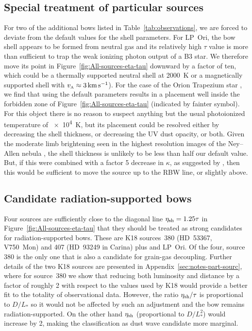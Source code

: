 \subsection{Special treatment of particular sources}
\label{sec:spec-treatm-part}

For two of the additional bows listed in Table~\ref{tab:observations},
we are forced to deviate from the default values for the shell
parameters.  For LP~Ori, the bow shell appears to be formed from
neutral gas \citep{ODell:2001c} and its relatively high \(\tau\) value is
more than sufficient to trap the weak ionizing photon output of a B3
star.  We therefore move its point in
Figure~\ref{fig:All-sources-eta-tau} downward by a factor of ten,
which could be a thermally supported neutral shell at \SI{2000}{K} or
a magnetically supported shell with
\(v_{\scriptscriptstyle\text{A}} \approx \SI{3}{km.s^{-1}}\)).  For the case of the Orion
Trapezium star \thD{}, we find that using the default parameters
results in a placement well inside the forbidden zone of
Figure~\ref{fig:All-sources-eta-tau} (indicated by fainter symbol).
For this object there is no reason to suspect anything but the usual
photoionized temperature of \SI{e4}{K}, but its placement could be
resolved either by decreasing the shell thickness, or decreasing the
UV dust opacity, or both. Given the moderate limb brightening seen in
the highest resolution images of the Ney--Allen nebula
\citep{Robberto:2005a, Smith:2005a}, the shell thickness is unlikely
to be less than half our default value.  But, if this were combined
with a factor 5 decrease in \(\kappa\), as suggested by
\citet{Salgado:2016a}, then this would be sufficient to move the
source up to the RBW line, or slightly above.


\subsection{Candidate radiation-supported bows}
\label{sec:cand-radi-supp}

Four sources are sufficiently close to the diagonal line
\(\eta_{\text{sh}} = 1.25 \tau\) in Figure~\ref{fig:All-sources-eta-tau}
that they should be treated as strong candidates for
radiation-supported bows. These are K18 sources~380 (HD~53367,
V750~Mon) and 407 (HD~93249 in Carina) plus \thD{} and LP~Ori.  Of the
four, source 380 is the only one that is also a candidate for
grain-gas decoupling.  Further details of the two K18 sources are
presented in Appendix~\ref{sec:notes-part-sourc}, where for source~380
we show that reducing both luminosity and distance by a factor of
roughly 2 with respect to the values used by K18 would provide a
better fit to the totality of observational data.  However, the ratio
\(\eta_{\text{sh}} /\tau\) is proportional to \(D / L_*\) so it would not be
affected by such an adjustment and the bow remains
radiation-supported.  On the other hand \(\eta_{\text{sh}}\) (proportional
to \(D / L_*^2\)) would increase by 2, making the classification as
dust wave candidate more marginal.

